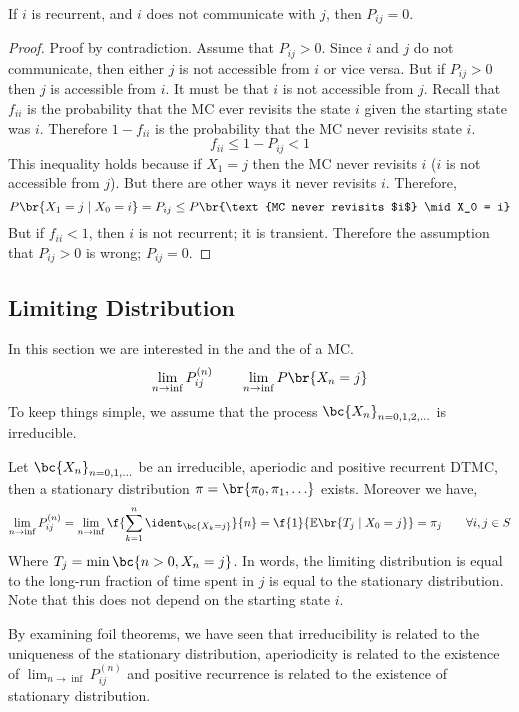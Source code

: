\documentclass{article}
\newcommand{\Exp}{\mathbb{E}}
\begin{document}
\begin{theorem}
    If $i$ is recurrent, and $i$ does not communicate with $j$, then $P_{ij} = 0$.
\end{theorem}
\begin{proof}
    Proof by contradiction. Assume that $P_{ij} > 0$. Since $i$ and $j$ do not communicate, then either $j$ is not accessible from $i$ or vice versa. But if $P_{ij}>0$ then $j$ is accessible from $i$. It must be that $i$ is not accessible from $j$. Recall that $f_{ii}$ is the probability that the MC ever revisits the state $i$ given the starting state was $i$. Therefore $1 - f_{ii}$ is the probability that the MC never revisits state $i$.
    \[ f_{ii} \leq 1 - P_{ij} < 1 \]
    This inequality holds because if $X_1 = j$ then the MC never revisits $i$ ($i$ is not accessible from $j$). But there are other ways it never revisits $i$. Therefore,
    \[ P\br{X_1 = j \mid X_0 = i} = P_{ij} \leq P\br{\text{MC never revisits $i$} \mid X_0 = i} \]
    But if $f_{ii} < 1$, then $i$ is not recurrent; it is transient. Therefore the assumption that $P_{ij} > 0$ is wrong; $P_{ij} = 0$.
\end{proof}

\subsection{Limiting Distribution}

In this section we are interested in the  and the  of a MC.
\[ \lim_{n \to \inf} P^{(n)}_{ij} \qquad \lim_{n \to \inf} P\br{X_n = j} \]
To keep things simple, we assume that the process $\bc{X_n}_{n=0,1,2,\dots}$ is irreducible.

\begin{theorem}
     Let $\bc{X_n}_{n=0,1,\ldots}$ be an irreducible, aperiodic and positive recurrent DTMC, then a stationary distribution $\pi = \br{\pi_0, \pi_1, \ldots}$ exists. Moreover we have,
    \[ \lim_{n \to \inf} P^{(n)}_{ij} = \lim_{n \to \inf} \f{\sum_{k=1}^{n} \ident_{\bc{X_k = j}}}{n} = \f{1}{\Exp\br{T_j \mid X_0 = j}} = \pi_j \qquad \forall i,j \in S \]
    Where $T_j = \min\bc{n > 0, X_n = j}$. In words, the limiting distribution is equal to the long-run fraction of time spent in $j$ is equal to the stationary distribution. Note that this does not depend on the starting state $i$.
\end{theorem}

By examining foil theorems, we have seen that irreducibility is related to the uniqueness of the stationary distribution, aperiodicity is related to the existence of $\lim_{n \to \inf} P^{(n)}_{ij}$ and positive recurrence is related to the existence of stationary distribution. \\
\end{document}
